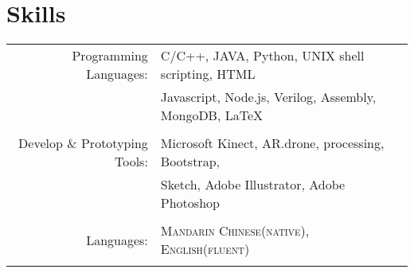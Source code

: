 \documentclass[a4paper,10pt]{article} %
\begin{document}







\section{Skills}

\begin{tabular}{rl}
Programming Languages: & C/C++, JAVA, Python, UNIX shell scripting, HTML
			\\&		   
			Javascript, Node.js, Verilog, Assembly, MongoDB, {\fb \LaTeX}\setmainfont[SmallCapsFont=Fontin SmallCaps]{Fontin-Regular}\\
			&\\

Develop \& Prototyping Tools: & Microsoft Kinect, AR.drone, processing, Bootstrap,\\
& Sketch, Adobe Illustrator, Adobe Photoshop\\
&\\

Languages: & \textsc{Mandarin Chinese(native)}, \textsc{English(fluent)}\\
&\\

\end{tabular}
\end{document}
